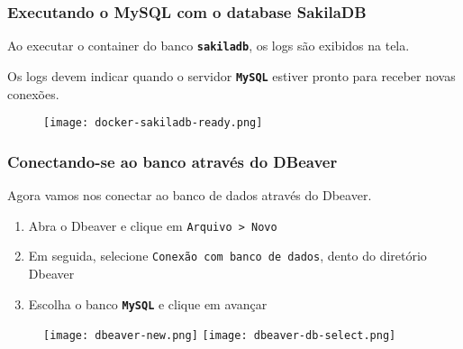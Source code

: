 \documentclass[t, 10pt, aspectratio=169, table, x11names]{beamer}
\begin{document}
	\begin{frame}[t]
		\frametitle{Executando o MySQL com o database SakilaDB}
		Ao executar o container do banco \textbf{\texttt{sakiladb}}, os logs são exibidos na tela.
		
		Os logs devem indicar quando o servidor \texttt{\textbf{MySQL}} estiver pronto para receber novas conexões.
		\vspace{0.1cm}
		\begin{figure}[h]
			\texttt{[image: docker-sakiladb-ready.png]}
		\end{figure}
	\end{frame}

	\begin{frame}[t]
		\frametitle{Conectando-se ao banco através do DBeaver}
		Agora vamos nos conectar ao banco de dados através do Dbeaver.
		
		\begin{enumerate}
			\small
			\item Abra o Dbeaver e clique em \texttt{Arquivo > Novo}
			\item Em seguida, selecione \texttt{Conexão com banco de dados}, dento do diretório Dbeaver
			\item Escolha o banco \texttt{\textbf{MySQL}} e clique em avançar
		\end{enumerate}
		
		\vspace{0.1cm}
		\begin{figure}[h]
			\texttt{[image: dbeaver-new.png]}
			\hspace{0.5cm}
			\texttt{[image: dbeaver-db-select.png]}
		\end{figure}
	\end{frame}
	
\end{document}
